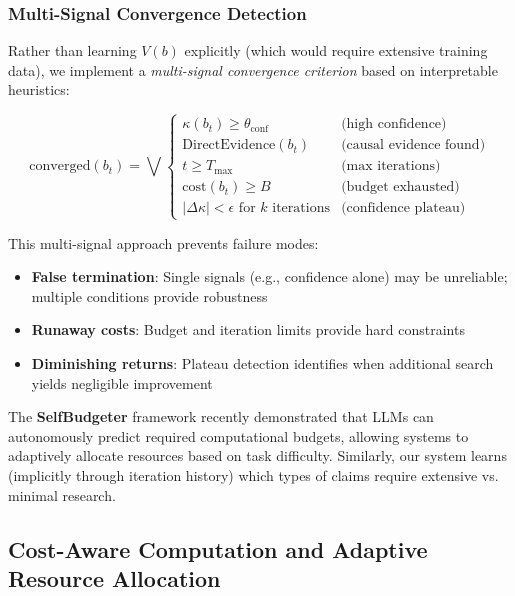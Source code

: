 \subsubsection{Multi-Signal Convergence Detection}

Rather than learning $V(b)$ explicitly (which would require extensive training data), we implement a \textit{multi-signal convergence criterion} based on interpretable heuristics:

\begin{equation}
\text{converged}(b_t) = \bigvee \begin{cases}
    \kappa(b_t) \geq \theta_{\text{conf}} & \text{(high confidence)} \\
    \text{DirectEvidence}(b_t) & \text{(causal evidence found)} \\
    t \geq T_{\max} & \text{(max iterations)} \\
    \text{cost}(b_t) \geq B & \text{(budget exhausted)} \\
    |\Delta \kappa| < \epsilon \text{ for } k \text{ iterations} & \text{(confidence plateau)}
\end{cases}
\label{eq:convergence_criteria}
\end{equation}

This multi-signal approach prevents failure modes:
\begin{itemize}
    \item \textbf{False termination}: Single signals (e.g., confidence alone) may be unreliable; multiple conditions provide robustness
    \item \textbf{Runaway costs}: Budget and iteration limits provide hard constraints
    \item \textbf{Diminishing returns}: Plateau detection identifies when additional search yields negligible improvement
\end{itemize}

The \textbf{SelfBudgeter} framework \citep{selfbudgeter2025} recently demonstrated that LLMs can autonomously predict required computational budgets, allowing systems to adaptively allocate resources based on task difficulty. Similarly, our system learns (implicitly through iteration history) which types of claims require extensive vs. minimal research.

\subsection{Cost-Aware Computation and Adaptive Resource Allocation}

